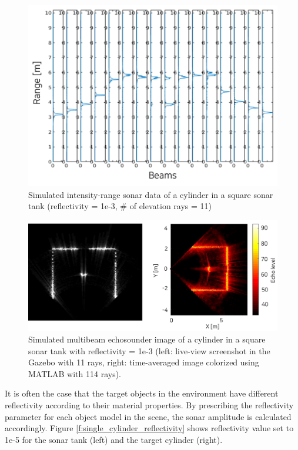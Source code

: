 \documentclass[utf8]{frontiersSCNS} %
\begin{document}
\begin{figure}[ht]
  \centering
  \includegraphics[width=\columnwidth]{images/intensity_range.png}
  \caption{Simulated intensity-range sonar data of a cylinder in a square sonar tank (reflectivity = 1e-3, \# of elevation rays = 11)}
  \label{f:intensity_range}
\end{figure}

\begin{figure}[ht]
  \centering
  \includegraphics[width=\columnwidth]{images/single_cylinder_sonar_image.png}
  \caption{Simulated multibeam echosounder image of a cylinder in a square sonar tank with reflectivity = 1e-3 (left: live-view screenshot in the Gazebo with 11 rays, right: time-averaged image colorized using MATLAB with 114 rays).}
  \label{f:single_cylindr_sonar_image}
\end{figure}

It is often the case that the target objects in the environment have different reflectivity according to their material properties. By prescribing the reflectivity parameter for each object model in the scene, the sonar amplitude is calculated accordingly. Figure \ref{f:single_cylinder_reflectivity} shows reflectivity value set to 1e-5 for the sonar tank (left) and the target cylinder (right).
\end{document}

